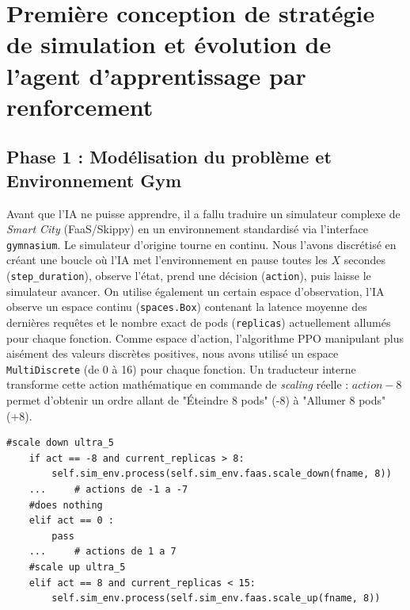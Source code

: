 \section{Première conception de stratégie de simulation et évolution de l'agent d'apprentissage par renforcement}

\subsection{Phase 1 : Modélisation du problème et Environnement Gym}
Avant que l'IA ne puisse apprendre, il a fallu traduire un simulateur complexe de \textit{Smart City} (FaaS/Skippy) en un environnement standardisé via l'interface \texttt{gymnasium}.
Le simulateur d'origine tourne en continu. Nous l'avons discrétisé en créant une boucle où l'IA met l'environnement en pause toutes les $X$ secondes (\texttt{step\_duration}), observe l'état, prend une décision (\texttt{action}), puis laisse le simulateur avancer.
On utilise également un certain espace d'observation, l'IA observe un espace continu (\texttt{spaces.Box}) contenant la latence moyenne des dernières requêtes et le nombre exact de pods (\texttt{replicas}) actuellement allumés pour chaque fonction.
Comme espace d'action, l'algorithme PPO manipulant plus aisément des valeurs discrètes positives, nous avons utilisé un espace \texttt{MultiDiscrete} (de 0 à 16) pour chaque fonction. Un traducteur interne transforme cette action mathématique en commande de \textit{scaling} réelle : $action - 8$ permet d'obtenir un ordre allant de "Éteindre 8 pods" (-8) à "Allumer 8 pods" (+8).

\begin{lstlisting}[caption= Différentes actions possibles pour chaque step]
    #scale down ultra_5
    if act == -8 and current_replicas > 8: 
        self.sim_env.process(self.sim_env.faas.scale_down(fname, 8))
    ...     # actions de -1 a -7
    #does nothing
    elif act == 0 : 
        pass
    ...     # actions de 1 a 7
    #scale up ultra_5
    elif act == 8 and current_replicas < 15: 
        self.sim_env.process(self.sim_env.faas.scale_up(fname, 8))
\end{lstlisting}


